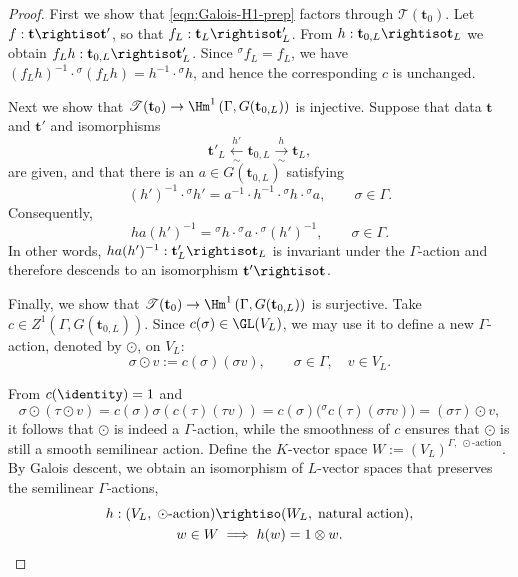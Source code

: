 \begin{proof}
	First we show that \eqref{eqn:Galois-H1-prep} factors through
	$\mathscr{T}(\mathbf{t}_0)$. Let
	$f:\mathbf{t}\rightiso\mathbf{t}'$, so that
	$f_L:\mathbf{t}_L\rightiso\mathbf{t}'_L$. From
	$h:\mathbf{t}_{0,L}\rightiso\mathbf{t}_L$ we obtain
	$f_Lh:\mathbf{t}_{0,L}\rightiso\mathbf{t}'_L$. Since
	${}^\sigma f_L=f_L$, we have
	$(f_Lh)^{-1}\cdot{}^\sigma(f_Lh)=h^{-1}\cdot{}^\sigma h$, and hence the
	corresponding $c$ is unchanged.

	Next we show that
	$\mathscr{T}(\mathbf{t}_0)\to
	\Hm^1\left(\Gamma,G(\mathbf{t}_{0,L})\right)$ is injective. Suppose that
	data $\mathbf{t}$ and $\mathbf{t}'$ and isomorphisms
	\[
	\mathbf{t}'_L\xleftarrow[\sim]{h'}\mathbf{t}_{0,L}
	\xrightarrow[\sim]{h}\mathbf{t}_L,
	\]
	are given, and that there is an $a\in G(\mathbf{t}_{0,L})$ satisfying
	\[
	(h')^{-1}\cdot{}^\sigma h'
	=a^{-1}\cdot h^{-1}\cdot{}^\sigma h\cdot{}^\sigma a,
	\qquad\sigma\in\Gamma.
	\]
	Consequently,
	\[
	ha(h')^{-1}
	={}^\sigma h\cdot{}^\sigma a\cdot{}^\sigma(h')^{-1},
	\qquad\sigma\in\Gamma.
	\]
	In other words,
	$ha(h')^{-1}:\mathbf{t}'_L\rightiso\mathbf{t}_L$ is invariant under the
	$\Gamma$-action and therefore descends to an isomorphism
	$\mathbf{t}'\rightiso\mathbf{t}$.

	Finally, we show that
	$\mathscr{T}(\mathbf{t}_0)\to
	\Hm^1\left(\Gamma,G(\mathbf{t}_{0,L})\right)$ is surjective. Take
	$c\in Z^1(\Gamma,G(\mathbf{t}_{0,L}))$. Since
	$c(\sigma)\in\GL(V_L)$, we may use it to define a new $\Gamma$-action,
	denoted by $\odot$, on $V_L$:
	\[
	\sigma\odot v:=c(\sigma)(\sigma v),
	\qquad\sigma\in\Gamma,\quad v\in V_L.
	\]

	From $c(\identity)=1$ and
	\[
	\sigma\odot(\tau\odot v)
	=c(\sigma)\sigma(c(\tau)(\tau v))
	=c(\sigma)\bigl({}^\sigma c(\tau)(\sigma\tau v)\bigr)
	=(\sigma\tau)\odot v,
	\]
	it follows that $\odot$ is indeed a $\Gamma$-action, while the smoothness
	of $c$ ensures that $\odot$ is still a smooth semilinear action. Define the
	$K$-vector space
	$W:=(V_L)^{\Gamma,\;\odot\text{-action}}$. By Galois descent, we obtain an
	isomorphism of $L$-vector spaces that preserves the semilinear
	$\Gamma$-actions,
	\begin{gather*}
		h:(V_L,\;\odot\text{-action})\rightiso
		(W_L,\;\text{natural action}),\\
		w\in W\implies h(w)=1\otimes w.
	\end{gather*}


\end{proof}
